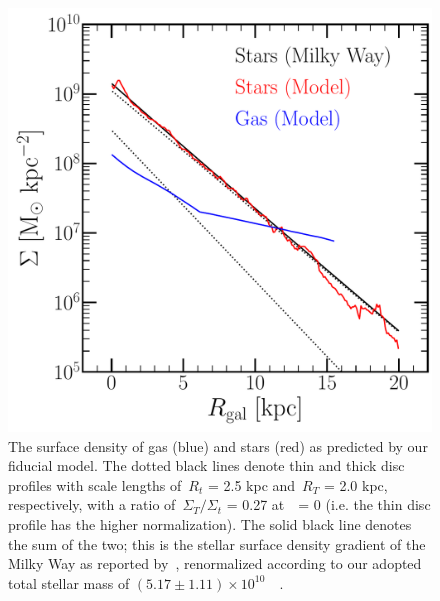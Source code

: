 \begin{figure} 
\centering 
\includegraphics[scale = 0.45]{surface_density_gradient.pdf} 
\caption{The surface density of gas (blue) and stars (red) as predicted by our 
fiducial model. The dotted black lines denote thin and thick disc 
profiles with scale lengths of~$R_t$ = 2.5 kpc and~$R_T$ = 2.0 kpc, 
respectively, with a ratio of~$\Sigma_T/\Sigma_t$ = 0.27 at~\rgal~= 0 (i.e. the 
thin disc profile has the higher normalization). 
The solid black line denotes the sum of the two; this is the stellar surface 
density gradient of the Milky Way as reported by~\citet{Bland-Hawthorn2016}, 
renormalized according to our adopted total stellar mass of 
$(5.17 \pm 1.11)\times10^{10}$~\msun~\citep{Licquia2015}. } 
\label{migration:fig:surface_density} 
\end{figure} 

